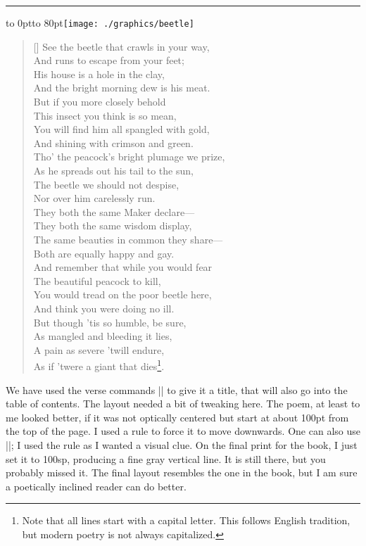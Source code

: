 \clearpage

\rule{50sp}{100pt}
\vbox to 0pt{\hfill\hbox to 80pt{\texttt{[image: ./graphics/beetle]}}}
\begin{verse}[\versewidth]
See the beetle that crawls in your way,\\
\vin And runs to escape from your feet;\\
His house is a hole in the clay,\\
\vin And the bright morning dew is his meat.\\
\bigskip
But if you more closely behold\\
\vin This insect you think is so mean,\\
You will find him all spangled with gold,\\
\vin And shining with crimson and green.\\
\bigskip
Tho' the peacock's bright plumage we prize,\\
\vin As he spreads out his tail to the sun,\\
The beetle we should not despise,\\
\vin Nor over him carelessly run.\\
\bigskip
They both the same Maker declare---\\
\vin They both the same wisdom display,\\
The same beauties in common they share---\\
\vin Both are equally happy and gay.\\
\bigskip
And remember that while you would fear\\
\vin The beautiful peacock to kill,\\
You would tread on the poor beetle here,\\
\vin And think you were doing no ill.\\
\bigskip
But though 'tis so humble, be sure,\\
\vin As mangled and bleeding it lies,\\
A pain as severe 'twill endure,\\
\vin As if 'twere a giant that dies\footnote{Note that all lines start with a capital letter. This follows English tradition, but modern poetry is not always capitalized.}.\\
\end{verse}
\clearpage


\begin{multicols}{2}
We have used the verse commands |\poemtitle| to give it a title, that will also go into the table of contents. The layout needed a bit of tweaking here. The poem, at least to me looked better, if it was not optically centered but start at about 100pt from the top of the page.  I used a rule to force it to move downwards. One can also use |\vspace*|; I used the rule as I wanted a visual clue. On the final print for the book, I just set it to 100sp, producing a fine gray vertical line. It is still there, but you probably missed it. The final layout resembles the one in the book, but I am sure a poetically inclined reader can do better. 
\end{multicols}

